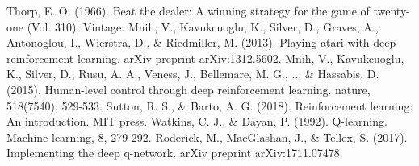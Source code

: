 \documentclass[conference]{IEEEtran}
\begin{document}

\begin{thebibliography}{00}
 Thorp, E. O. (1966). Beat the dealer: A winning strategy for the game of twenty-one (Vol. 310). Vintage.
 Mnih, V., Kavukcuoglu, K., Silver, D., Graves, A., Antonoglou, I., Wierstra, D., \& Riedmiller, M. (2013). Playing atari with deep reinforcement learning. arXiv preprint arXiv:1312.5602.
 Mnih, V., Kavukcuoglu, K., Silver, D., Rusu, A. A., Veness, J., Bellemare, M. G., ... \& Hassabis, D. (2015). Human-level control through deep reinforcement learning. nature, 518(7540), 529-533.
 Sutton, R. S., \& Barto, A. G. (2018). Reinforcement learning: An introduction. MIT press.
 Watkins, C. J., \& Dayan, P. (1992). Q-learning. Machine learning, 8, 279-292.
 Roderick, M., MacGlashan, J., \& Tellex, S. (2017). Implementing the deep q-network. arXiv preprint arXiv:1711.07478.
\end{thebibliography}
\end{document}
